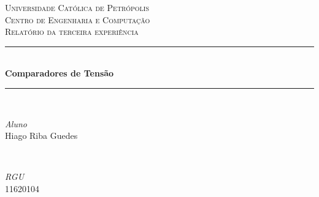 \documentclass[11pt]{article}
\begin{document}

\begin{titlepage} %
	\newcommand{\HRule}{\rule{\linewidth}{0.5mm}} %
	
	\center %
	
	
	\textsc{\LARGE Universidade Católica de Petrópolis}\\[1.5cm] %
	
	\textsc{\Large Centro de Engenharia e Computação}\\[0.5cm] %
	
	\textsc{\large Relatório da terceira experiência}\\[0.5cm] %
	
	
	\HRule\\[0.4cm]
	
	{\huge\bfseries  Comparadores de Tensão}\\[0.4cm] %
	
	\HRule\\[1.5cm]
	
	
	\begin{minipage}{0.4\textwidth}
		\begin{flushleft}
			\large
			\textit{Aluno}\\
			Hiago Riba Guedes %
		\end{flushleft}
	\end{minipage}
	~
	\begin{minipage}{0.4\textwidth}
		\begin{flushright}
			\large
			\textit{RGU}\\
			11620104 %
		\end{flushright}
	\end{minipage}
	

\end{titlepage}
\end{document}
